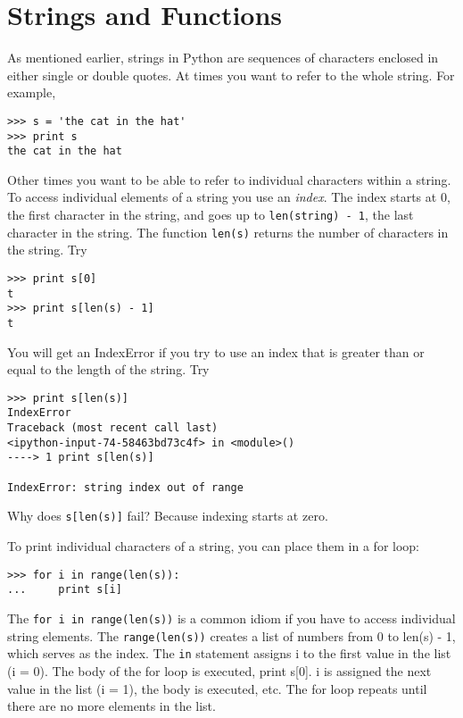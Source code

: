 \documentclass[12pt]{article}
\begin{document}
\section*{Strings and Functions}

As mentioned earlier, strings in Python are sequences of characters enclosed in either single or double quotes. At times you want to refer to the whole string. For example,

\begin{verbatim}
>>> s = 'the cat in the hat'
>>> print s
the cat in the hat
\end{verbatim}

Other times you want to be able to refer to individual characters within a string. To access individual elements of a string you use an \emph{index}. The index starts at 0, the first character in the string, and goes up to \texttt{len(string) - 1}, the last character in the string. The function \texttt{len(s)} returns the number of characters in the string. Try

\begin{verbatim}
>>> print s[0]
t
>>> print s[len(s) - 1]
t
\end{verbatim}

You will get an IndexError if you try to use an index that is greater than or equal to the length of the string. Try

\begin{verbatim}
>>> print s[len(s)]
IndexError                                
Traceback (most recent call last)
<ipython-input-74-58463bd73c4f> in <module>()
----> 1 print s[len(s)]

IndexError: string index out of range
\end{verbatim}

Why does \texttt{s[len(s)]} fail? Because indexing starts at zero. 

To print individual characters of a string, you can place them in a for loop:

\begin{verbatim}
>>> for i in range(len(s)):
...     print s[i]        
\end{verbatim}

The \texttt{for i in range(len(s))} is a common idiom if you have to access individual string elements. The \texttt{range(len(s))} creates a list of numbers from 0 to len(s) - 1, which serves as the index. The \texttt{in} statement assigns i to the first value in the list (i = 0). The body of the for loop is executed, print s[0]. i is assigned the next value in the list (i = 1), the body is executed, etc. The for loop repeats until there are no more elements in the list.   
\end{document}
